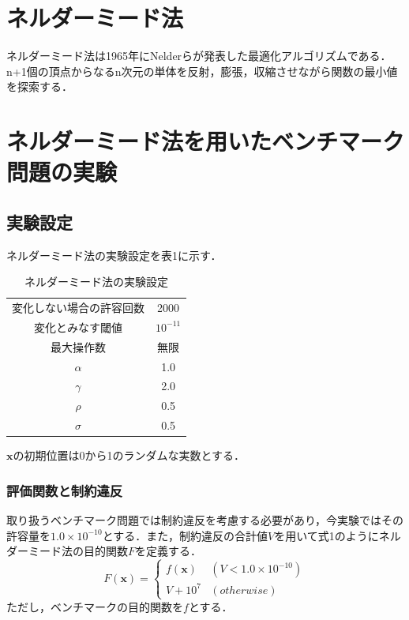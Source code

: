 \documentclass[twocolumn]{jarticle}
\begin{document}



\section{ネルダーミード法}
ネルダーミード法\cite{10.1093/comjnl/7.4.308}は1965年にNelderらが発表した最適化アルゴリズムである．n+1個の頂点からなるn次元の単体を反射，膨張，収縮させながら関数の最小値を探索する．


\section{ネルダーミード法を用いたベンチマーク問題の実験}
	\subsection{実験設定}
		ネルダーミード法の実験設定を表1に示す．
		\begin{table}[htbp]
			\begin{center}
				\caption{ネルダーミード法の実験設定}
				\begin{tabular}{| c | c |} \hline
					変化しない場合の許容回数 & 2000 \\
					変化とみなす閾値 & $10^{-11}$ \\ 
					最大操作数 & 無限 \\
					$\alpha$ & 1.0 \\
					$\gamma$ & 2.0 \\
					$\rho$ & 0.5 \\
					$\sigma$ & 0.5 \\ \hline
					
				\end{tabular}
			\end{center}
		\end{table}
		
		$\bm{x}$の初期位置は0から1のランダムな実数とする．

	\subsubsection{評価関数と制約違反}
		取り扱うベンチマーク問題では制約違反を考慮する必要があり，今実験ではその許容量を$1.0\times10^{-10}$とする．また，制約違反の合計値$V$を用いて式1のようにネルダーミード法の目的関数$F$を定義する．
		\begin{equation}
			F(\bm{x}) = \begin{cases}
				f(\bm{x}) & (V < 1.0\times10^{-10}) \\
				V + 10^7 & (otherwise)
			\end{cases}
		\end{equation}
		ただし，ベンチマークの目的関数を$f$とする．
		
\end{document}
